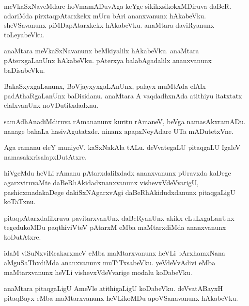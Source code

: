 \documentclass{article}
\begin{document}
\begin{mn}
meVkaSxNaveMdare  hoVmamADuvAga  keYge  sikikxsikokxMDiruva  daBeR.  adariMda  pirxtaqpAtarxkekx  mUru  bAri  ananxvanunx  
hAkabeVku.  sheVSavanunx  piMDapAtarxkekx  hAkabeVku.  anaMtara  daviRyanunx  toLeyabeVku.
\end{mn}

\begin{mn}
anaMtara  meVkaSxNavanunx  beMkiyalilx  hAkabeVku.  anaMtara  pAterxgaLanUnx  hAkabeVku.  pAterxya  balabAgadalilx  
ananxvanunx  baDisabeVku.
\end{mn}

\begin{mn}
BakaSxyxgaLanunx,  BoVjayxyxgaLAnUnx,  palayx  muMtAda  elAlx  padAthaRgaLanUnx  baDisidanu.  anaMtara  A  vaqdadhxnAda  
atithiyu  itatxtatx  elalxvanUnx  noVDutitxdadxnu.
\end{mn}

\begin{mn}
samAdhAnadiMdiruva  rAmananunx  kuritu  rAmaneV,  beVga  namasAkxramADu.  nanage  bahaLa  hasivAgutatxde.  ninanx  
apapxNeyAdare  UTa  mADutetxVne.
\end{mn}

\begin{mn}
Aga  ramanu  eleY  muniyeV,  kaSxNakAla  tALu.  deVvategaLU  pitaqgaLU  IgaleV  namasakxrisalapxDutAtxre.
\end{mn}

\begin{mn}
hiVgeMdu  heVLi  rAmanu  pAtarxdalilxdadx  ananxvanunx  pUravxda  kaDege  agarxviruvaMte  daBeRhAkidadxnanxvanunx  
vishevxVdeVvarigU,  pashicxmadakaDege  dakiSxNAgarxvAgi  daBeRhAkidudxdanunx  pitaqgaLigU  koTaTxnu.
\end{mn}

\begin{mn}
pitaqpAtarxdalilxruva  pavitarxvanUnx  daBeRyanUnx  akikx  eLuLxgaLanUnx  tegedukoMDu  paqthiviVteV  pAtarxM  
eMba  maMtarxdiMda  ananxvanunx  koDutAtxre.
\end{mn}

\begin{mn}
idaM  viSuNxviRcakarxmeV  eMba  maMtarxvanunx  heVLi  bArxhamxNana  aMguSaThxdiMda  ananxvanunx  muTiTxsabeVku.  
yeVdeVvAdivi  eMba  maMtarxvanunx  heVLi  vishevxVdeVvarige  modalu  koDabeVku.
\end{mn}

\begin{mn}
anaMtara  pitaqgaLigU  AmeVle  atithigaLigU  koDabeVku.  deVvatABayxH  pitaqBayx  eMba  maMtarxvanunx  heVLikoMDu  
apoVSanavanunx  hAkabeVku.
\end{mn}
\end{document}
